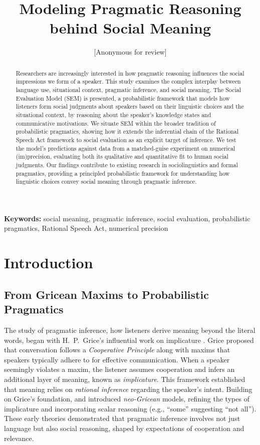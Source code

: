 \documentclass[12pt,a4paper]{article}
\title{Modeling Pragmatic Reasoning behind Social Meaning}
\author{[Anonymous for review]}
\date{}
\begin{document}
\maketitle

\begin{abstract}
Researchers are increasingly interested in how pragmatic reasoning influences
the social impressions we form of a speaker. This study examines the complex
interplay between language use, situational context, pragmatic inference, and
social meaning. The Social Evaluation Model (SEM) is presented, a probabilistic
framework that models how listeners form social judgments about speakers based
on their linguistic choices and the situational context, by reasoning about the
speaker's knowledge states and communicative motivations. We situate SEM within
the broader tradition of probabilistic pragmatics, showing how it extends the
inferential chain of the Rational Speech Act framework to social evaluation as
an explicit target of inference. We test the model's predictions against data
from a matched-guise experiment on numerical (im)precision, evaluating both its
qualitative and quantitative fit to human social judgments. Our findings
contribute to existing research in
sociolinguistics and formal pragmatics, providing a principled probabilistic
framework for understanding how linguistic choices convey social meaning through
pragmatic inference.
\end{abstract}

\noindent\textbf{Keywords:} social meaning, pragmatic inference, social
evaluation, probabilistic pragmatics, Rational Speech Act, numerical precision

\section{Introduction}

\subsection{From Gricean Maxims to Probabilistic Pragmatics}

The study of pragmatic inference, how listeners derive meaning beyond the
literal words, began with H.~P.~Grice's influential work on implicature
\citep{grice}. Grice proposed that conversation follows a \emph{Cooperative
Principle} along with maxims that speakers typically adhere to for effective
communication. When a speaker seemingly violates a maxim, the listener assumes
cooperation and infers an additional layer of meaning, known as
\emph{implicature}. This framework established that meaning relies on
\emph{rational inference} regarding the speaker's intent. Building on Grice's
foundation, \citet{horn1989} and \citet{levinson2000} introduced
\emph{neo-Gricean} models, refining the types of implicature and incorporating
scalar reasoning (e.g., ``some'' suggesting ``not all''). These early theories
demonstrated that pragmatic inference involves not just language but also social
reasoning, shaped by expectations of cooperation and relevance.
\end{document}
